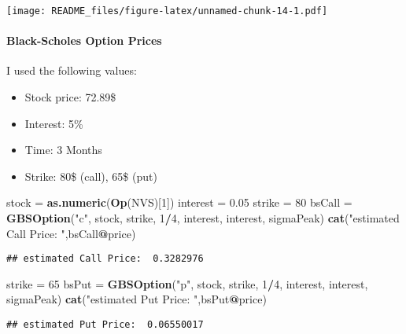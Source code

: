 \documentclass[]{article}
\newenvironment{Shaded}{\begin{snugshade}}{\end{snugshade}}
\newcommand{\KeywordTok}[1]{\textcolor[rgb]{0.13,0.29,0.53}{\textbf{#1}}}
\newcommand{\DecValTok}[1]{\textcolor[rgb]{0.00,0.00,0.81}{#1}}
\newcommand{\FloatTok}[1]{\textcolor[rgb]{0.00,0.00,0.81}{#1}}
\newcommand{\StringTok}[1]{\textcolor[rgb]{0.31,0.60,0.02}{#1}}
\newcommand{\OperatorTok}[1]{\textcolor[rgb]{0.81,0.36,0.00}{\textbf{#1}}}
\newcommand{\NormalTok}[1]{#1}
\providecommand{\tightlist}{%
  \setlength{\itemsep}{0pt}\setlength{\parskip}{0pt}}
\let\oldparagraph\paragraph
\renewcommand{\paragraph}[1]{\oldparagraph{#1}\mbox{}}
\begin{document}
\texttt{[image: README\_files/figure-latex/unnamed-chunk-14-1.pdf]}

\paragraph{Black-Scholes Option
Prices}\label{black-scholes-option-prices-2}

I used the following values:

\begin{itemize}
\tightlist
\item
  Stock price: 72.89\$
\item
  Interest: 5\%
\item
  Time: 3 Months
\item
  Strike: 80\$ (call), 65\$ (put)
\end{itemize}

\begin{Shaded}
\begin{Highlighting}[]
\NormalTok{stock =}\StringTok{ }\KeywordTok{as.numeric}\NormalTok{(}\KeywordTok{Op}\NormalTok{(NVS)[}\DecValTok{1}\NormalTok{])}
\NormalTok{interest =}\StringTok{ }\FloatTok{0.05}
\NormalTok{strike =}\StringTok{ }\DecValTok{80}
\NormalTok{bsCall =}\StringTok{ }\KeywordTok{GBSOption}\NormalTok{(}\StringTok{"c"}\NormalTok{, stock, strike, }\DecValTok{1}\OperatorTok{/}\DecValTok{4}\NormalTok{, interest, interest, sigmaPeak)}
\KeywordTok{cat}\NormalTok{(}\StringTok{"estimated Call Price: "}\NormalTok{,bsCall}\OperatorTok{@}\NormalTok{price)}
\end{Highlighting}
\end{Shaded}

\begin{verbatim}
## estimated Call Price:  0.3282976
\end{verbatim}

\begin{Shaded}
\begin{Highlighting}[]
\NormalTok{strike =}\StringTok{ }\DecValTok{65}
\NormalTok{bsPut =}\StringTok{ }\KeywordTok{GBSOption}\NormalTok{(}\StringTok{"p"}\NormalTok{, stock, strike, }\DecValTok{1}\OperatorTok{/}\DecValTok{4}\NormalTok{, interest, interest, sigmaPeak)}
\KeywordTok{cat}\NormalTok{(}\StringTok{"estimated Put Price: "}\NormalTok{,bsPut}\OperatorTok{@}\NormalTok{price)}
\end{Highlighting}
\end{Shaded}

\begin{verbatim}
## estimated Put Price:  0.06550017
\end{verbatim}
\end{document}
